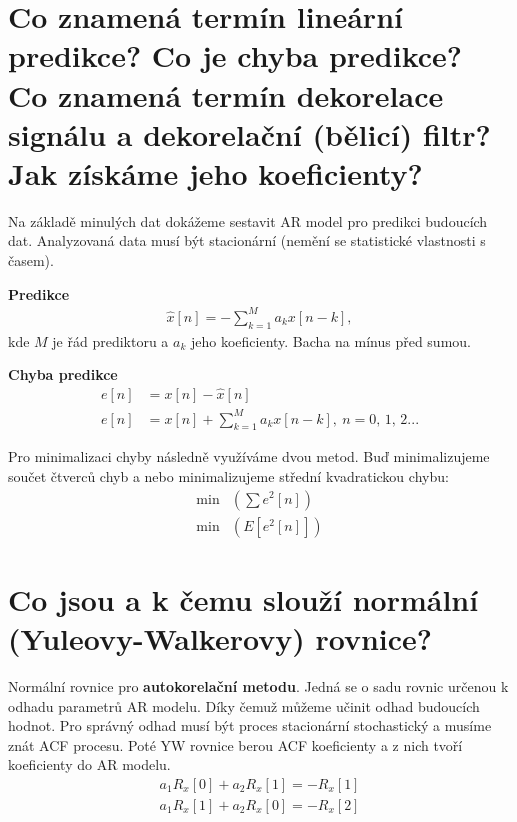 \documentclass[a4paper,12pt]{article}   %
\newcommand{\mt}[1]{$#1$}
\begin{document}
\FloatBarrier

\section{Co znamená termín lineární predikce? Co je chyba predikce? Co znamená termín dekorelace signálu a dekorelační (bělicí) filtr? Jak získáme jeho koeficienty?}\label{sec:lin:predikce}

Na základě minulých dat dokážeme sestavit AR model pro predikci budoucích dat. Analyzovaná data musí být stacionární (nemění se statistické vlastnosti s časem).

\textbf{Predikce}
\begin{align*}
        \hat{x}[n] = -\sum ^M _{k=1} a_k x[n-k],
\end{align*}
kde \mt{M} je řád prediktoru a \mt{a_k} jeho koeficienty. Bacha na mínus před sumou.

\textbf{Chyba predikce}
\begin{align*}
        e[n] &= x[n] - \hat{x}[n]\\
        e[n] &= x[n] + \sum_{k=1}^M a_k x[n-k],~n=0,\,1,\,2...
\end{align*}

Pro minimalizaci chyby následně využíváme dvou metod. Buď minimalizujeme součet čtverců chyb a nebo minimalizujeme střední kvadratickou chybu:
\begin{align*}
        \text{min}&(\sum e^2[n] )\\
        \text{min}&(E[e^2[n]])
\end{align*}


\section{Co jsou a k čemu slouží normální (Yuleovy-Walkerovy) rovnice?}\label{sec:yule}
Normální rovnice pro \textbf{autokorelační metodu}. Jedná se o sadu rovnic určenou k odhadu parametrů AR modelu. Díky čemuž můžeme učinit odhad budoucích hodnot. Pro správný odhad musí být proces stacionární stochastický a musíme znát ACF procesu. Poté YW rovnice berou ACF koeficienty a z nich tvoří koeficienty do AR modelu.
\begin{align*}
        a_1 R_x[0] + a_2 R_x[1] = -R_x[1]\\
        a_1 R_x[1] + a_2 R_x[0] = -R_x[2]
\end{align*}


\end{document}
